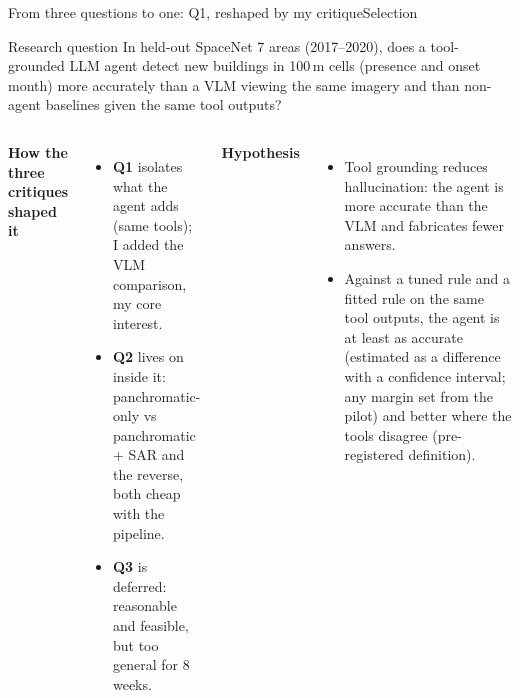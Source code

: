 \documentclass[aspectratio=169,11pt]{beamer}
\begin{document}
\begin{frame}[shrink=16]{From three questions to one: Q1, reshaped by my critique}{Selection}
\begin{block}{Research question}\small
In held-out SpaceNet 7 areas (2017--2020), does a tool-grounded LLM agent detect new buildings in 100\,m cells (presence and onset month) more accurately than \alert{a VLM viewing the same imagery} and than \alert{non-agent baselines given the same tool outputs}?
\end{block}
\begin{columns}[T,onlytextwidth]
\textbf{How the three critiques shaped it}
\begin{itemize}\footnotesize
  \item \textbf{Q1} isolates what the agent adds (same tools); I added the VLM comparison, my core interest.
  \item \textbf{Q2} lives on inside it: panchromatic-only vs panchromatic + SAR and the reverse, both cheap with the pipeline.
  \item \textbf{Q3} is deferred: reasonable and feasible, but too general for 8 weeks.
\end{itemize}
\textbf{Hypothesis}
\begin{itemize}\footnotesize
  \item Tool grounding reduces hallucination: the agent is more accurate than the VLM and fabricates fewer answers.
  \item Against a tuned rule and a fitted rule on the same tool outputs, the agent is at least as accurate (estimated as a difference with a confidence interval; any margin set from the pilot) and better where the tools disagree (pre-registered definition).
\end{itemize}
\end{columns}
\end{frame}
\end{document}
